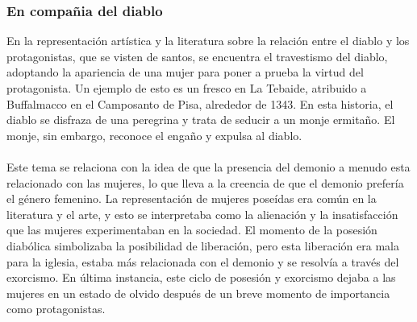 \documentclass{report}
\begin{document}
\subsubsection{En compañia del diablo}
En la representación artística y la literatura sobre la relación entre el diablo y los protagonistas, que se visten de santos, se encuentra el travestismo del diablo, adoptando la apariencia de una mujer para poner a prueba la virtud del protagonista. Un ejemplo de esto es un fresco en La Tebaide, atribuido a Buffalmacco en el Camposanto de Pisa, alrededor de 1343. En esta historia, el diablo se disfraza de una peregrina y trata de seducir a un monje ermitaño. El monje, sin embargo, reconoce el engaño y expulsa al diablo.
\\\\
Este tema se relaciona con la idea de que la presencia del demonio a menudo esta relacionado con las mujeres, lo que lleva a la creencia de que el demonio prefería el género femenino. La representación de mujeres poseídas era común en la literatura y el arte, y esto se interpretaba como la alienación y la insatisfacción que las mujeres experimentaban en la sociedad. El momento de la posesión diabólica simbolizaba la posibilidad de liberación, pero esta liberación era mala para la iglesia, estaba más relacionada con el demonio y se resolvía a través del exorcismo. En última instancia, este ciclo de posesión y exorcismo dejaba a las mujeres en un estado de olvido después de un breve momento de importancia como protagonistas.
\end{document}
